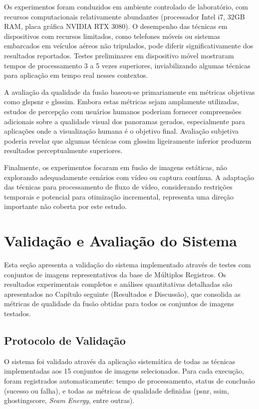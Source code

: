 Os experimentos foram conduzidos em ambiente controlado de laboratório, com recursos computacionais relativamente abundantes (processador Intel i7, 32GB RAM, placa gráfica NVIDIA RTX 3080). O desempenho das técnicas em dispositivos com recursos limitados, como telefones móveis ou sistemas embarcados em veículos aéreos não tripulados, pode diferir significativamente dos resultados reportados. Testes preliminares em dispositivo móvel mostraram tempos de processamento 3 a 5 vezes superiores, inviabilizando algumas técnicas para aplicação em tempo real nesses contextos.

A avaliação da qualidade da fusão baseou-se primariamente em métricas objetivas como gls{psnr} e gls{ssim}. Embora estas métricas sejam amplamente utilizadas, estudos de percepção com usuários humanos poderiam fornecer compreensões adicionais sobre a qualidade visual dos panoramas gerados, especialmente para aplicações onde a visualização humana é o objetivo final. Avaliação subjetiva poderia revelar que algumas técnicas com gls{ssim} ligeiramente inferior produzem resultados perceptualmente superiores.

Finalmente, os experimentos focaram em fusão de imagens estáticas, não explorando adequadamente cenários com vídeo ou captura contínua. A adaptação das técnicas para processamento de fluxo de vídeo, considerando restrições temporais e potencial para otimização incremental, representa uma direção importante não coberta por este estudo.



\section{Validação e Avaliação do Sistema}

Esta seção apresenta a validação do sistema implementado através de testes com conjuntos de imagens representativos da base de Múltiplos Registros. Os resultados experimentais completos e análises quantitativas detalhadas são apresentados no Capítulo seguinte (Resultados e Discussão), que consolida as métricas de qualidade da fusão obtidas para todos os conjuntos de imagens testados.

\subsection{Protocolo de Validação}

O sistema foi validado através da aplicação sistemática de todas as técnicas implementadas aos 15 conjuntos de imagens selecionados. Para cada execução, foram registrados automaticamente: tempo de processamento, status de conclusão (sucesso ou falha), e todas as métricas de qualidade definidas (\gls{psnr}, \gls{ssim}, \gls{ghostingscore}, \textit{Seam Energy}, entre outras).

